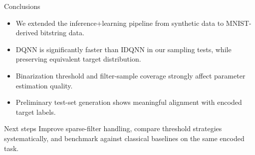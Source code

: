 \documentclass[aspectratio=169]{beamer}
\begin{document}
\begin{frame}{Conclusions}
  \begin{itemize}
    \item We extended the inference+learning pipeline from synthetic data to MNIST-derived bitstring data.
    \item DQNN is significantly faster than IDQNN in our sampling tests, while preserving equivalent target distribution.
    \item Binarization threshold and filter-sample coverage strongly affect parameter estimation quality.
    \item Preliminary test-set generation shows meaningful alignment with encoded target labels.
  \end{itemize}

  \vspace{0.4em}
  \begin{block}{Next steps}
    Improve sparse-filter handling, compare threshold strategies systematically, and benchmark against classical baselines on the same encoded task.
  \end{block}
\end{frame}
\end{document}

